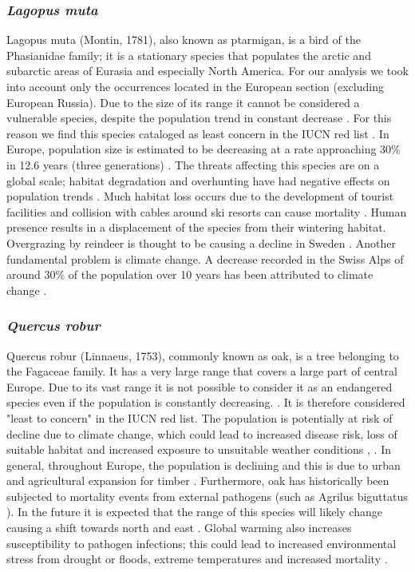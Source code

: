 \documentclass[12pt,a4paper]{article}
\begin{document}
\subsubsection{\textit{Lagopus muta}} %
Lagopus muta (Montin, 1781), also known as ptarmigan, is a bird of the Phasianidae family; it is a stationary species that populates the arctic and subarctic areas of Eurasia and especially North America. For our analysis we took into account only the occurrences located in the European section (excluding European Russia).
Due to the size of its range it cannot be considered a vulnerable species, despite the population trend in constant decrease \citep{IUCN}.
For this reason we find this species cataloged as least concern in the IUCN red list \citep{IUCN}.
In Europe, population size is estimated to be decreasing at a rate approaching 30\% in 12.6 years (three generations) \citep{bird}.
The threats affecting this species are on a global scale; habitat degradation and overhunting have had negative effects on population trends \citep{mad}. Much habitat loss occurs due to the development of tourist facilities and collision with cables around ski resorts can cause mortality \citep{IUCN}.
Human presence results in a displacement of the species from their wintering habitat. Overgrazing by reindeer is thought to be causing a decline in Sweden \citep{sto}.
Another fundamental problem is climate change.
A decrease recorded in the Swiss Alps of around 30\% of the population over 10 years has been attributed to climate change \citep{de}.

\subsubsection{\textit{Quercus robur}} %
Quercus robur (Linnaeus, 1753), commonly known as oak, is a tree belonging to the Fagaceae family.
It has a very large range that covers a large part of central Europe.
Due to its vast range it is not possible to consider it as an endangered species even if the population is constantly decreasing. \citep{khe}. It is therefore considered "least to concern" in the IUCN red list. \citep{IUCN}
The population is potentially at risk of decline due to climate change, which could lead to increased disease risk, loss of suitable habitat and increased exposure to unsuitable weather conditions \citep{jon}, \citep{IUCN}.
In general, throughout Europe, the population is declining and this is due to urban and agricultural expansion for timber \citep{du}.
Furthermore, oak has historically been subjected to mortality events from external pathogens (such as Agrilus biguttatus \citep{eat}).
In the future it is expected that the range of this species will likely change causing a shift towards north and east \citep{ef}.
Global warming also increases susceptibility to pathogen infections; this could lead to increased environmental stress from drought or floods, extreme temperatures and increased mortality \citep{jon}.
\end{document}
